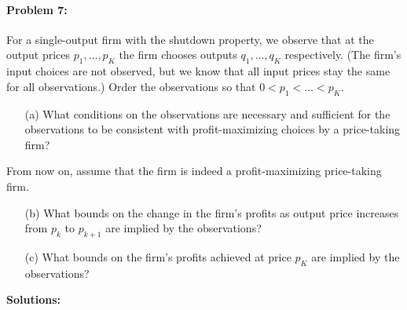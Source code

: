 \documentclass[12pt]{article}
\begin{document}
\paragraph{Problem 7:} For a single-output firm with the shutdown property, we observe that at the output prices $p_1,\dots,p_K$ the firm chooses outputs $q_1,\dots,q_K$ respectively.  (The firm's input choices are not observed, but we know that all input prices stay the same for all observations.) Order the
observations so that $0 < p_1 < \dots < p_K$.

\begin{itemize}
    \item[(a)] What conditions on the observations are necessary and sufficient for the observations to be consistent with profit-maximizing choices by a price-taking firm?

\end{itemize}


\noindent From now on, assume that the firm is indeed a profit-maximizing price-taking firm.


\begin{itemize}
    \item[(b)] What bounds on the change in the firm's profits as output price increases from $p_k$ to $p_{k+1}$ are implied by the observations?

    \item[(c)] What bounds on the firm's profits achieved at price $p_K$ are implied by the observations?
\end{itemize}

\medskip

\textbf{Solutions:}
\end{document}
